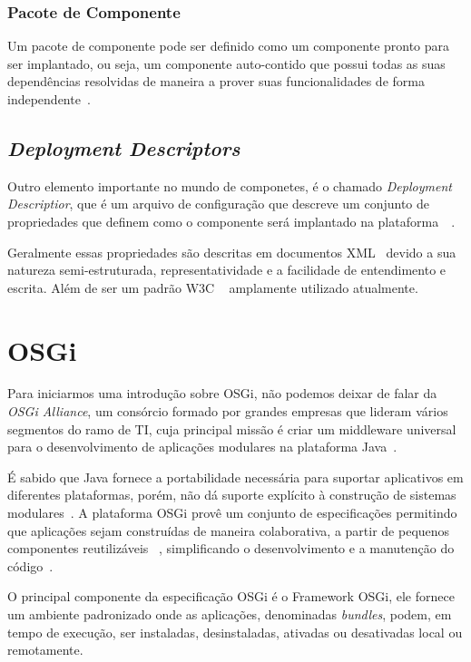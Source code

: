 \subsubsection{Pacote de Componente}
Um pacote de componente pode ser definido como um componente pronto para ser implantado, ou seja, um componente auto-contido que possui todas as suas dependências resolvidas de maneira a prover suas funcionalidades de forma independente~\cite{cervantes2005technical}.

\subsection{\textit{Deployment Descriptors}}
Outro elemento importante no mundo de componetes, é o chamado \textit{Deployment Descriptior}, que é um arquivo de configuração que descreve um conjunto de propriedades que definem como o componente será implantado na plataforma~\cite{deploy}~\cite{deployoasis}. 

Geralmente essas propriedades são descritas em documentos XML~\cite{xml} devido a sua natureza semi-estruturada, representatividade e a facilidade de entendimento e escrita. Além de ser um padrão W3C ~\cite{w3c} amplamente utilizado atualmente.

\section{OSGi}
\label{sec:osgi}

Para iniciarmos uma introdução sobre OSGi, não podemos deixar de falar da \textit{OSGi Alliance}, um consórcio formado por grandes empresas que lideram vários segmentos do ramo de TI, cuja principal missão é criar um middleware universal para o desenvolvimento de aplicações modulares na plataforma Java~\cite{osgiorg}.

É sabido que Java fornece a portabilidade necessária para suportar aplicativos em diferentes plataformas, porém, não dá suporte explícito à construção de sistemas modulares~\cite{hall2010osgi}. A plataforma OSGi provê um conjunto de especificações permitindo que aplicações sejam construídas de maneira colaborativa, a partir de pequenos componentes reutilizáveis ~\cite{osgiorg}, simplificando o desenvolvimento e a manutenção do código~\cite{hall2010osgi}.

O principal componente da especificação OSGi é o Framework OSGi, ele fornece um ambiente padronizado onde as aplicações, denominadas \textit{bundles}, podem, em tempo de execução,  ser instaladas, desinstaladas, ativadas ou desativadas local ou remotamente.


